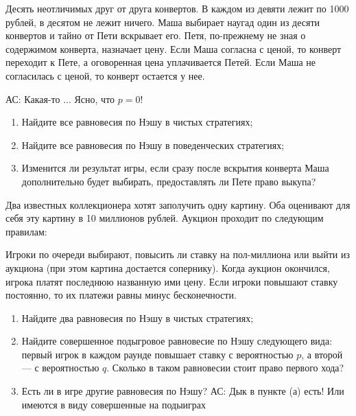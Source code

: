 \begin{problem}
Десять неотличимых друг от друга конвертов. В каждом из девяти лежит по 1000 рублей, в десятом не лежит ничего. Маша выбирает наугад один из десяти конвертов и тайно от Пети вскрывает его. Петя, по-прежнему не зная о содержимом конверта, назначает цену. Если Маша согласна с ценой, то конверт переходит к Пете, а оговоренная цена уплачивается Петей. Если Маша не согласилась с ценой, то конверт остается у нее.\par

{\red АС: Какая-то ... Ясно, что $p=0$!}

\begin{enumerate}
\item Найдите все равновесия по Нэшу в чистых стратегиях;\par
\item Найдите все равновесия по Нэшу в {\red поведенческих} стратегиях;\par
\item  Изменится ли результат игры, если сразу после вскрытия конверта Маша дополнительно будет выбирать, предоставлять ли Пете право выкупа?
\end{enumerate}


\begin{sol}

\end{sol}
\end{problem}



\begin{problem}\par
\begin{source} \cite{cramton:lectures}\end{source}
Два известных коллекционера хотят заполучить одну картину. Оба оценивают для себя эту картину в 10 миллионов рублей. Аукцион проходит по следующим правилам:\par
Игроки по очереди выбирают, повысить ли ставку на пол-миллиона или выйти из аукциона (при этом картина достается сопернику). Когда аукцион окончился,  игрока платят последнюю названную ими цену. Если игроки повышают ставку постоянно, то их платежи равны минус бесконечности.
\begin{enumerate}
\item Найдите два равновесия по Нэшу в чистых стратегиях;\par
\item Найдите совершенное подыгровое равновесие по Нэшу следующего вида: первый игрок в каждом раунде повышает ставку с вероятностью  $p$, а второй --- с вероятностью  $q$. Сколько в таком равновесии стоит право первого хода?\par
\item  Есть ли в игре другие равновесия по Нэшу? {\red АС: Дык в пункте (а) есть! Или имеются в виду совершенные на подыиграх} 
\end{enumerate}

\begin{sol}

\end{sol}
\end{problem}




